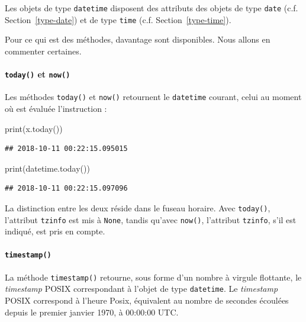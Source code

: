 \documentclass[12pt,]{book}
\newenvironment{Shaded}{\begin{snugshade}}{\end{snugshade}}
\newcommand{\BuiltInTok}[1]{#1}
\newcommand{\NormalTok}[1]{#1}
\let\oldparagraph\paragraph
\renewcommand{\paragraph}[1]{\oldparagraph{#1}\mbox{}}
\numberwithin{equation}{section}
\numberwithin{countremarque}{section}
\begin{document}
Les objets de type \texttt{datetime} disposent des attributs des objets
de type \texttt{date} (c.f. Section~\ref{type-date}) et de type
\texttt{time} (c.f. Section~\ref{type-time}).

Pour ce qui est des méthodes, davantage sont disponibles. Nous allons en
commenter certaines.

\paragraph{\texorpdfstring{\texttt{today()} et
\texttt{now()}}{today() et now()}}\label{today-et-now}

Les méthodes \texttt{today()} et \texttt{now()} retournent le
\texttt{datetime} courant, celui au moment où est évaluée l'instruction
:

\begin{Shaded}
\begin{Highlighting}[]
\BuiltInTok{print}\NormalTok{(x.today())}
\end{Highlighting}
\end{Shaded}

\begin{lstlisting}
## 2018-10-11 00:22:15.095015
\end{lstlisting}

\begin{Shaded}
\begin{Highlighting}[]
\BuiltInTok{print}\NormalTok{(datetime.today())}
\end{Highlighting}
\end{Shaded}

\begin{lstlisting}
## 2018-10-11 00:22:15.097096
\end{lstlisting}

La distinction entre les deux réside dans le fuseau horaire. Avec
\texttt{today()}, l'attribut \texttt{tzinfo} est mis à \texttt{None},
tandis qu'avec \texttt{now()}, l'attribut \texttt{tzinfo}, s'il est
indiqué, est pris en compte.

\paragraph{\texorpdfstring{\texttt{timestamp()}}{timestamp()}}\label{timestamp}

La méthode \texttt{timestamp()} retourne, sous forme d'un nombre à
virgule flottante, le \emph{timestamp} POSIX correspondant à l'objet de
type \texttt{datetime}. Le \emph{timestamp} POSIX correspond à l'heure
Posix, équivalent au nombre de secondes écoulées depuis le premier
janvier 1970, à 00:00:00 UTC.
\end{document}
